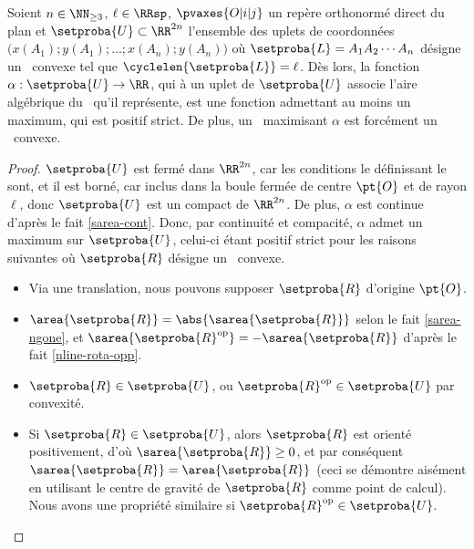\begin{fact} \label{at-least-one-ncycle}
    Soient $n \in \NN_{\geq3}$,
    $\ell \in \RRsp$,
    $\pvaxes{O | i | j}$ un repère orthonormé direct du plan
    et
    $\setproba{U} \subset \RR^{2n}$ l'ensemble des uplets de coordonnées $\big( x(A_1) ; y(A_1) ; \dots ; x(A_n) ; y(A_n) \big)$ où $\setproba{L} = A_1 A_2 \cdots A_n$ désigne un \ncycle\ convexe tel que $\cyclelen{\setproba{L}} = \ell$.
    Dès lors, la fonction $\alpha: \setproba{U} \rightarrow \RR$, qui à un uplet de $\setproba{U}$ associe l'aire algébrique du \ncycle\ qu'il représente, est une fonction admettant au moins un maximum, qui est positif strict.
    De plus, un \ncycle\ maximisant $\alpha$ est forcément un \ngone\ convexe.
\end{fact}


\begin{proof}
     $\setproba{U}$ est fermé dans $\RR^{2n}$, car les conditions le définissant le sont, et il est borné, car inclus dans la boule fermée de centre $\pt{O}$ et de rayon $\ell$,
     donc $\setproba{U}$ est un compact de $\RR^{2n}$.
     De plus, $\alpha$ est continue d'après le fait \ref{sarea-cont}.
     Donc, par continuité et compacité, $\alpha$ admet un maximum sur $\setproba{U}$, celui-ci étant positif strict pour les raisons suivantes où $\setproba{R}$ désigne un \nreg\ convexe.
    \begin{itemize}
        \item Via une translation, nous pouvons supposer $\setproba{R}$ d'origine $\pt{O}$.

        \item $\area{\setproba{R}} = \abs{\sarea{\setproba{R}}}$
        selon le fait \ref{sarea-ngone},
        et
        $\sarea{\setproba{R}^{\mathrm{op}}} = - \sarea{\setproba{R}}$ d'après le fait \ref{nline-rota-opp}.

        \item $\setproba{R} \in \setproba{U}$, ou $\setproba{R}^{\mathrm{op}} \in \setproba{U}$ par convexité.

        \item Si $\setproba{R} \in \setproba{U}$, alors
        $\setproba{R}$ est orienté positivement,
        d'où $\sarea{\setproba{R}} \geq 0$,
        et par conséquent $\sarea{\setproba{R}} = \area{\setproba{R}}$
        (ceci se démontre aisément en utilisant le centre de gravité de $\setproba{R}$ comme point de calcul).
        Nous avons une propriété similaire si $\setproba{R}^{\mathrm{op}} \in \setproba{U}$.


\end{itemize}
\end{proof}
